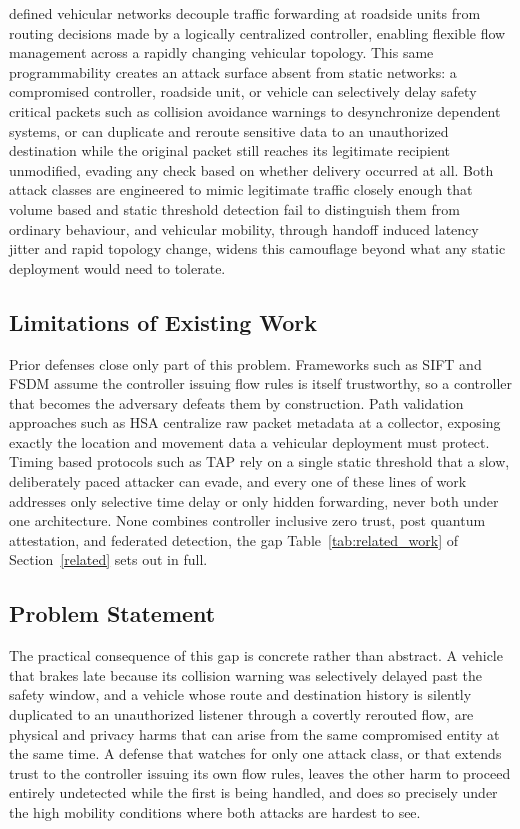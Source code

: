 \documentclass[lettersize,journal]{IEEEtran}
\theoremstyle{plain}
\theoremstyle{remark}
\begin{document}
	 defined vehicular networks decouple traffic
	forwarding at roadside units from routing decisions made by a logically
	centralized controller, enabling flexible flow management across a
	rapidly changing vehicular topology. This same programmability creates
	an attack surface absent from static networks: a compromised controller,
	roadside unit, or vehicle can selectively delay safety critical packets
	such as collision avoidance warnings to desynchronize dependent systems,
	or can duplicate and reroute sensitive data to an unauthorized
	destination while the original packet still reaches its legitimate
	recipient unmodified, evading any check based on whether delivery
	occurred at all. Both attack classes are engineered to mimic legitimate
	traffic closely enough that volume based and static threshold detection
	fail to distinguish them from ordinary behaviour, and vehicular
	mobility, through handoff induced latency jitter and rapid topology
	change, widens this camouflage beyond what any static deployment would
	need to tolerate.
	
	\subsection{Limitations of Existing Work}\label{subsec:intro_limitations}
	
	Prior defenses close only part of this problem. Frameworks such as SIFT
	and FSDM assume the controller issuing flow rules is itself trustworthy,
	so a controller that becomes the adversary defeats them by construction.
	Path validation approaches such as HSA centralize raw packet metadata at
	a collector, exposing exactly the location and movement data a
	vehicular deployment must protect. Timing based protocols such as TAP
	rely on a single static threshold that a slow, deliberately paced
	attacker can evade, and every one of these lines of work addresses only
	selective time delay or only hidden forwarding, never both under one
	architecture. None combines controller inclusive zero trust, post
	quantum attestation, and federated detection, the gap
	Table~\ref{tab:related_work} of Section~\ref{related} sets out in full.
	
	\subsection{Problem Statement}\label{subsec:problem_statement}
	
	The practical consequence of this gap is concrete rather than abstract.
	A vehicle that brakes late because its collision warning was
	selectively delayed past the safety window, and a vehicle whose route
	and destination history is silently duplicated to an unauthorized
	listener through a covertly rerouted flow, are physical and privacy
	harms that can arise from the same compromised entity at the same time.
	A defense that watches for only one attack class, or that extends trust
	to the controller issuing its own flow rules, leaves the other harm to
	proceed entirely undetected while the first is being handled, and does
	so precisely under the high mobility conditions where both attacks are
	hardest to see.
	
\end{document}
